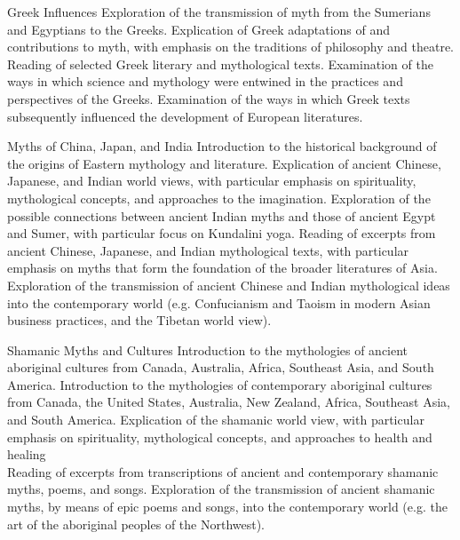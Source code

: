 \documentclass[letterpaper,10pt,headsepline]{scrreprt}
\begin{document}
\begin{compactdesc}
\item[Greek Influences]
Exploration of the transmission of myth from the Sumerians and Egyptians to the Greeks.
Explication of Greek adaptations of and contributions to myth, with emphasis on the traditions of philosophy and theatre.
Reading of selected Greek literary and mythological texts.
Examination of the ways in which science and mythology were entwined in the practices and perspectives of the Greeks.
Examination of the ways in which Greek texts subsequently influenced the development of European literatures.\\
\newpage
\item[Myths of China, Japan, and India]
Introduction to the historical background of the origins of Eastern mythology and literature.
Explication of ancient Chinese, Japanese, and Indian world views, with particular emphasis on spirituality, mythological concepts, and approaches to the imagination.
Exploration of the possible connections between ancient Indian myths and those of ancient Egypt and Sumer, with particular focus on Kundalini yoga.
Reading of excerpts from ancient Chinese, Japanese, and Indian mythological texts, with particular emphasis on myths that form the foundation of the broader literatures of Asia.
Exploration of the transmission of ancient Chinese and Indian mythological ideas into the contemporary world (e.g. Confucianism and Taoism in modern Asian business practices, and the Tibetan world view).\\

\item[Shamanic Myths and Cultures]
Introduction to the mythologies of ancient aboriginal cultures from Canada, Australia, Africa, Southeast Asia, and South America.
Introduction to the mythologies of contemporary aboriginal cultures from Canada, the United States, Australia, New Zealand, Africa, Southeast Asia, and South America.
Explication of the shamanic world view, with particular emphasis on spirituality, mythological concepts, and approaches to health and healing\\
Reading of excerpts from transcriptions of ancient and contemporary shamanic myths, poems, and songs.
Exploration of the transmission of ancient shamanic myths, by means of epic poems and songs, into the contemporary world (e.g. the art of the aboriginal peoples of the Northwest).\\


\end{compactdesc}
\end{document}
